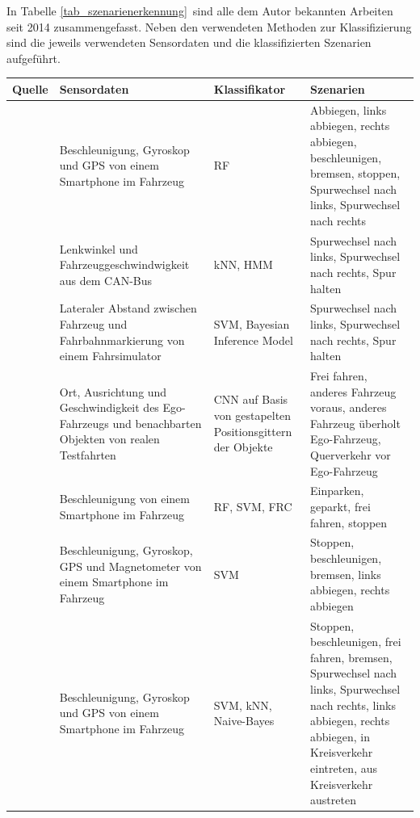 In Tabelle \ref{tab_szenarienerkennung} sind alle dem Autor bekannten Arbeiten seit 2014 zusammengefasst. Neben den verwendeten Methoden zur Klassifizierung sind die jeweils verwendeten Sensordaten und die klassifizierten Szenarien aufgeführt.

\begin{longtable}[c]{p{} p{4.5cm} p{} p{4.5cm}}
\textbf{Quelle} & \textbf{Sensordaten} & \textbf{Klassifikator} & \textbf{Szenarien} \\
\hline
\endhead

\cite{xie2018driving} & Beschleunigung, Gyroskop und GPS von einem Smartphone im Fahrzeug & \ac{RF} & Abbiegen, links abbiegen, rechts abbiegen, beschleunigen, bremsen, stoppen, Spurwechsel nach links, Spurwechsel nach rechts \\
\hline

\cite{zheng2017lane} & Lenkwinkel und Fahrzeuggeschwindwigkeit aus dem CAN-Bus & \ac{kNN}, \ac{HMM} & Spurwechsel nach links, Spurwechsel nach rechts, Spur halten \\
\hline

\cite{sun2017robust} & Lateraler Abstand zwischen Fahrzeug und Fahrbahnmarkierung von einem Fahrsimulator & \ac{SVM}, Bayesian Inference Model & Spurwechsel nach links, Spurwechsel nach rechts, Spur halten \\
\hline

\cite{gruner2017spatiotemporal} & Ort, Ausrichtung und Geschwindigkeit des Ego-Fahrzeugs und benachbarten Objekten von realen Testfahrten & \ac{CNN} auf Basis von gestapelten Positionsgittern der Objekte & Frei fahren, anderes Fahrzeug voraus, anderes Fahrzeug überholt Ego-Fahrzeug, Querverkehr vor Ego-Fahrzeug \\
\hline

\cite{cervantes2016vehicle} & Beschleunigung von einem Smartphone im Fahrzeug & \ac{RF}, \ac{SVM}, \ac{FRC} & Einparken, geparkt, frei fahren, stoppen \\
\hline

\cite{woo2016manoeuvre} & Beschleunigung, Gyroskop, GPS und Magnetometer von einem Smartphone im Fahrzeug & \ac{SVM} & Stoppen, beschleunigen, bremsen, links abbiegen, rechts abbiegen \\
\hline

\cite{camlica2016feature} & Beschleunigung, Gyroskop und GPS von einem Smartphone im Fahrzeug & \ac{SVM}, \ac{kNN}, Naive-Bayes & Stoppen, beschleunigen, frei fahren, bremsen, Spurwechsel nach links, Spurwechsel nach rechts, links abbiegen, rechts abbiegen, in Kreisverkehr eintreten, aus Kreisverkehr austreten \\
\hline


\end{longtable}
